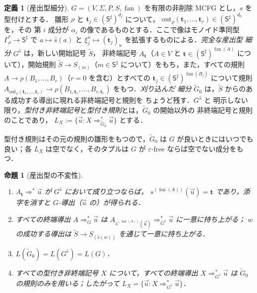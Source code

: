 \documentclass[11pt,a4paper]{ltjsarticle}
\numberwithin{equation}{section}
\theoremstyle{plain}
\newtheorem{proposition}[theorem]{命題}
\theoremstyle{definition}
\newtheorem{definition}[theorem]{定義}
\theoremstyle{remark}
\newcommand{\out}{\mathrm{out}}
\newcommand{\tuple}[1]{\vec{#1}}
\newcommand{\eps}{\varepsilon}
\newcommand{\fan}{\operatorname{fan}}
\theoremstyle{plain}
\begin{document}
\begin{definition}[産出型細分]
\label{def:output-refinement}
$G=(V,\Sigma,P,S,\fan)$ を有限の非削除 MCFG とし，$s$ を型付けとする．
雛形 $\rho$ と $\mathbf t_j\in(\mathsf S^\sharp)^{d_j}$ について，
$\out_\rho(\mathbf t_1,\ldots,\mathbf t_r)\in(\mathsf S^\sharp)^{d_0}$ を，その
第 $i$ 成分が $\alpha_i$ の像であるものとする．ここで像はモノイド準同型
$\Gamma_\rho^*\to\mathsf S^\sharp$ で $a\mapsto\widehat{s}(a)$ と
$\xi_j^\kappa\mapsto(\mathbf t_j)_\kappa$ を拡張するものによる．\emph{完全な産出型
細分} $G^{\widehat{s}}$ は，新しい開始記号 $\widetilde S$，
非終端記号 $A_{\mathbf t}$（$A\in V$ と
$\mathbf t\in(\mathsf S^\sharp)^{\fan(A)}$ について），開始規則
$\widetilde S\to S_{(m)}$（$m\in\mathsf S^\sharp$ について）をもち，また，すべての規則
$A\to\rho(B_1,\ldots,B_r)$（$r=0$ を含む）とすべての
$\mathbf t_j\in(\mathsf S^\sharp)^{\fan(B_j)}$ について規則
$A_{\out_\rho(\mathbf t_1,\ldots,\mathbf t_r)}\to
\rho(B_{1,\mathbf t_1},\ldots,B_{r,\mathbf t_r})$ をもつ．\emph{刈り込んだ
細分} $\widetilde G_0$ は，$\widetilde S$ からのある成功する導出に現れる非終端記号と規則を
ちょうど残す．$G^{\widehat{s}}$ と
明示しない限り，\emph{型付き非終端記号}と\emph{型付き規則}とは，$\widetilde G_0$ の開始以外の
非終端記号と規則のことであり，
$L_X:=\{\tuple u:X\Rightarrow_{\widetilde G_0}^*\tuple u\}$ とする．
\end{definition}

型付き規則はその元の規則の雛形をもつので，$\widetilde G_0$ は
$G$ が良いときにはいつでも良い；各 $L_X$ は空でなく，そのタプルは
$G$ が $\eps$-free ならば空でない成分をもつ．

\begin{proposition}[産出型の不変性]
\label{prop:output-invariants}
\begin{enumerate}[label=(\roman*),leftmargin=*]
\item $A_{\mathbf t}\Rightarrow^*\tuple u$ が $G^{\widehat{s}}$ において成り立つならば，
$\widehat{s}^{(\fan(A))}(\tuple u)=\mathbf t$ であり，添字を消すと
$G$-導出（$\tuple u$ の）が得られる．
\item すべての終端導出 $A\Rightarrow_G^*\tuple u$ は
$A_{\widehat{s}^{(\fan(A))}(\tuple u)}\Rightarrow_{G^{\widehat{s}}}^*\tuple u$ に一意に持ち上がる；
$w$ の成功する導出は $\widetilde S\to S_{(\widehat{s}(w))}$ を通じて一意に持ち上がる．
\item $L(\widetilde G_0)=L(G^{\widehat{s}})=L(G)$．
\item すべての型付き非終端記号 $X$ について，すべての終端導出
$X\Rightarrow^*_{G^{\widehat s}}\tuple u$ は $\widetilde G_0$ の規則のみを用いる；したがって
$L_X=\{\tuple u:X\Rightarrow^*_{G^{\widehat s}}\tuple u\}$．
\end{enumerate}
\end{proposition}
\end{document}
